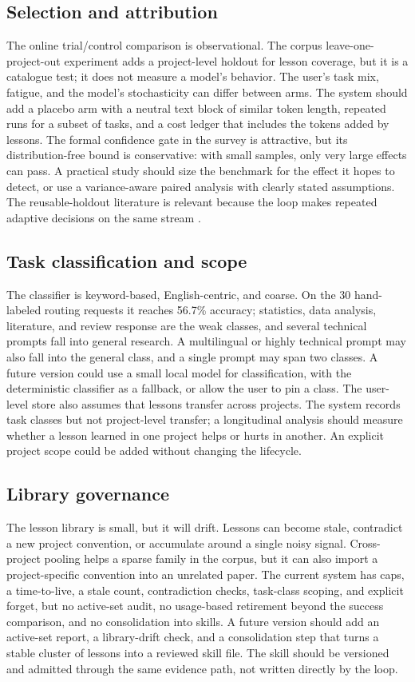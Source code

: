 \subsection{Selection and attribution}
The online trial/control comparison is observational. The corpus leave-one-project-out experiment adds a project-level holdout for lesson coverage, but it is a catalogue test; it does not measure a model's behavior. The user's task mix, fatigue, and the model's stochasticity can differ between arms. The system should add a placebo arm with a neutral text block of similar token length, repeated runs for a subset of tasks, and a cost ledger that includes the tokens added by lessons. The formal confidence gate in the survey is attractive, but its distribution-free bound is conservative: with small samples, only very large effects can pass. A practical study should size the benchmark for the effect it hopes to detect, or use a variance-aware paired analysis with clearly stated assumptions. The reusable-holdout literature is relevant because the loop makes repeated adaptive decisions on the same stream \citep{dwork2015reusable,cawley2010overfitting,blum2015ladder}.

\subsection{Task classification and scope}
The classifier is keyword-based, English-centric, and coarse. On the 30 hand-labeled routing requests it reaches 56.7\% accuracy; statistics, data analysis, literature, and review response are the weak classes, and several technical prompts fall into general research. A multilingual or highly technical prompt may also fall into the general class, and a single prompt may span two classes. A future version could use a small local model for classification, with the deterministic classifier as a fallback, or allow the user to pin a class. The user-level store also assumes that lessons transfer across projects. The system records task classes but not project-level transfer; a longitudinal analysis should measure whether a lesson learned in one project helps or hurts in another. An explicit project scope could be added without changing the lifecycle.

\subsection{Library governance}
The lesson library is small, but it will drift. Lessons can become stale, contradict a new project convention, or accumulate around a single noisy signal. Cross-project pooling helps a sparse family in the corpus, but it can also import a project-specific convention into an unrelated paper. The current system has caps, a time-to-live, a stale count, contradiction checks, task-class scoping, and explicit forget, but no active-set audit, no usage-based retirement beyond the success comparison, and no consolidation into skills. A future version should add an active-set report, a library-drift check, and a consolidation step that turns a stable cluster of lessons into a reviewed skill file. The skill should be versioned and admitted through the same evidence path, not written directly by the loop.

